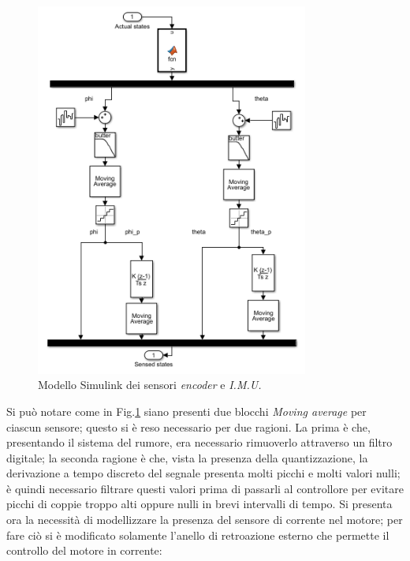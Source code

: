 \begin{figure}[H]
	\centering   	
	\includegraphics[width=0.8\textwidth]{Immagini/sensor_block1.png}
	\caption{Modello Simulink dei sensori \textit{encoder} e \textit{I.M.U.}}
	\label{fig:sensor_block1}
\end{figure}
Si può notare come in Fig.\ref{fig:sensor_block1} siano presenti due blocchi \textit{Moving average} per ciascun sensore; questo si è reso necessario per due ragioni.
La prima è che, presentando il sistema del rumore, era necessario rimuoverlo attraverso un filtro digitale; la seconda ragione è che, vista la presenza della quantizzazione, la derivazione a tempo discreto del segnale presenta molti picchi e molti valori nulli; è quindi necessario filtrare questi valori prima di passarli al controllore per evitare picchi di coppie troppo alti oppure nulli in brevi intervalli di tempo.
Si presenta ora la necessità di modellizzare la presenza del sensore di corrente nel motore; per fare ciò si è modificato solamente l'anello di retroazione esterno che permette il controllo del motore in corrente:

